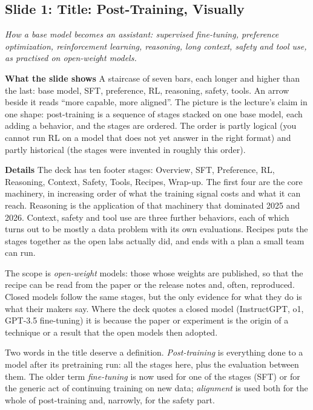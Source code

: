 \documentclass[11pt,letterpaper]{article}
\newcommand{\slide}[3]{%
  \subsection[Slide #1: #2]{Slide #1: #2}%
  {\color{muted}\itshape #3\par}\medskip}
\newcommand{\para}[1]{\medskip\noindent\textbf{#1}\quad}
\begin{document}
\slide{1}{Title: Post-Training, Visually}{How a base model becomes an assistant: supervised fine-tuning, preference optimization, reinforcement learning, reasoning, long context, safety and tool use, as practised on open-weight models.}

\para{What the slide shows} A staircase of seven bars, each longer and higher than the last: base model, SFT, preference, RL, reasoning, safety, tools. An arrow beside it reads ``more capable, more aligned''. The picture is the lecture's claim in one shape: post-training is a sequence of stages stacked on one base model, each adding a behavior, and the stages are ordered. The order is partly logical (you cannot run RL on a model that does not yet answer in the right format) and partly historical (the stages were invented in roughly this order).

\para{Details} The deck has ten footer stages: Overview, SFT, Preference, RL, Reasoning, Context, Safety, Tools, Recipes, Wrap-up. The first four are the core machinery, in increasing order of what the training signal costs and what it can reach. Reasoning is the application of that machinery that dominated 2025 and 2026. Context, safety and tool use are three further behaviors, each of which turns out to be mostly a data problem with its own evaluations. Recipes puts the stages together as the open labs actually did, and ends with a plan a small team can run.

The scope is \emph{open-weight} models: those whose weights are published, so that the recipe can be read from the paper or the release notes and, often, reproduced. Closed models follow the same stages, but the only evidence for what they do is what their makers say. Where the deck quotes a closed model (InstructGPT, o1, GPT-3.5 fine-tuning) it is because the paper or experiment is the origin of a technique or a result that the open models then adopted.

Two words in the title deserve a definition. \emph{Post-training} is everything done to a model after its pretraining run: all the stages here, plus the evaluation between them. The older term \emph{fine-tuning} is now used for one of the stages (SFT) or for the generic act of continuing training on new data; \emph{alignment} is used both for the whole of post-training and, narrowly, for the safety part.
\end{document}

